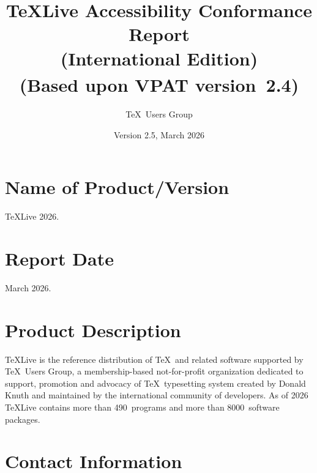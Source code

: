 \documentclass[titlepage]{article}
\begin{document}
\title{\TeX Live Accessibility Conformance Report\\
  (International Edition)\\
(Based upon VPAT\textsuperscript{\textregistered} version~2.4)}
\author{\TeX\ Users Group}
\date{Version 2.5, March 2026}

\hypersetup{
  pdftitle=TeX Live Accessibility Conformance Report,
  pdfauthor=TeX Users Group}
  
\maketitle

\newpage
{} 
\tableofcontents 

\newpage

\section{Name of Product/Version}
\label{sec:name}

\TeX Live 2026.


\section{Report Date}
\label{sec:date}

March 2026.


\section{Product Description}
\label{sec:description}

\TeX Live is the reference distribution of \TeX\ and related software
supported by \TeX\ Users Group, a membership-based not-for-profit
organization dedicated to support, promotion and advocacy of \TeX\
typesetting system created by Donald Knuth and maintained by the
international community of developers.  As of 2026 \TeX Live contains
more than 490~programs and more than 8000~software packages.

\section{Contact Information}
\label{sec:contact_info}
\end{document}
